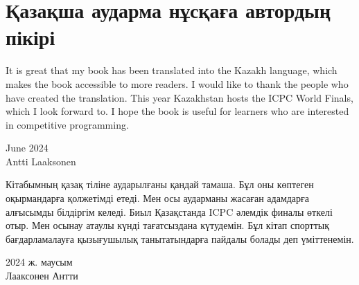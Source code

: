 \chapter*{Қазақша аударма нұсқаға автордың пікірі}

It is great that my book has been translated into the Kazakh language, which makes the book accessible to more readers. I would like to thank the people who have created the translation. This year Kazakhstan hosts the ICPC World Finals, which I look forward to. I hope the book is useful for learners who are interested in competitive programming.

\begin{flushright}
June 2024 \\
Antti Laaksonen
\end{flushright}


Кітабымның қазақ тіліне аударылғаны қандай тамаша. Бұл оны көптеген оқырмандарға қолжетімді етеді. Мен осы аударманы жасаған адамдарға алғысымды білдіргім келеді. Биыл Қазақстанда ICPC әлемдік финалы өткелі отыр. Мен осынау атаулы күнді тағатсыздана күтудемін. Бұл кітап спорттық бағдарламалауға қызығушылық танытатындарға пайдалы болады деп үміттенемін.   

\begin{flushright}
2024 ж. маусым \\
Лааксонен Антти
\end{flushright}



